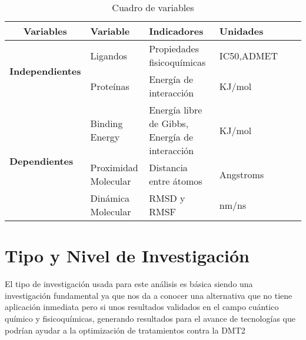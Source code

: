  \begin{table}[htbp]
 \caption{Cuadro de variables}\label{t1}
  \begin{tabular}{llcp{3.5cm}p{3.5cm}p{3.5cm}cp{3.5cm}}
  \hline
  \multicolumn{3}{c}{\textbf{Variables}}                       & \textbf{Variable}      & \textbf{Indicadores}                 & \textbf{Unidades} \\ \hline
  \multicolumn{3}{c}{\multirow{2}{*}{\textbf{Independientes}}} 
  & Ligandos & Propiedades fisicoquímicas & IC50,ADMET\\ \cline{4-6} 
  \multicolumn{3}{c}{}                                         &Proteínas  & Energía de interacción  & KJ/mol \\ \hline
  \multicolumn{3}{l}{\multirow{3}{*}{\textbf{Dependientes}}}   &Binding Energy   &Energía libre de Gibbs, Energía de interacción   & KJ/mol \\ \cline{4-6} 
  \multicolumn{3}{l}{}                                         &Proximidad Molecular   &Distancia entre átomos   &Angstroms \\ \cline{4-6} 
  \multicolumn{3}{l}{}                                         &Dinámica Molecular   &RMSD y RMSF   &nm/ns \\ \hline 
  \end{tabular}
\end{table}

\section{Tipo y Nivel de Investigación}
El tipo de investigación usada para este análisis es básica siendo una investigación fundamental ya que nos da a conocer una alternativa que no tiene aplicación inmediata pero si unos resultados validados en el campo cuántico químico y fisicoquímicas, generando resultados para el avance de tecnologías que podrían ayudar a la optimización de tratamientos contra la DMT2  


